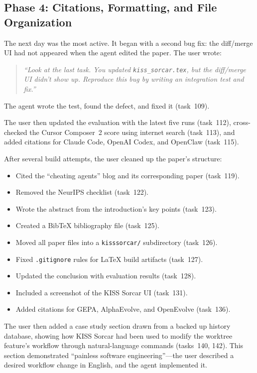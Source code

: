 \documentclass{article}
\begin{document}
\subsection{Phase 4: Citations, Formatting, and File Organization}
\label{sec:phase4}

The next day was the most active.  It began with a second bug fix: the diff/merge UI had not appeared when the agent edited the paper.  The user wrote:

\begin{quote}
\textit{``Look at the last task.  You updated \texttt{kiss\_sorcar.tex}, but the diff/merge UI didn't show up.  Reproduce this bug by writing an integration test and fix.''}
\end{quote}

The agent wrote the test, found the defect, and fixed it (task~109).

The user then updated the evaluation with the latest five runs (task~112), cross-checked the Cursor Composer~2 score using internet search (task~113), and added citations for Claude Code, OpenAI Codex, and OpenClaw (task~115).

After several build attempts, the user cleaned up the paper's structure:

\begin{itemize}[nosep]
  \item Cited the ``cheating agents'' blog and its corresponding paper (task~119).
  \item Removed the NeurIPS checklist (task~122).
  \item Wrote the abstract from the introduction's key points (task~123).
  \item Created a BibTeX bibliography file (task~125).
  \item Moved all paper files into a \texttt{kisssorcar/} subdirectory (task~126).
  \item Fixed \texttt{.gitignore} rules for \LaTeX{} build artifacts (task~127).
  \item Updated the conclusion with evaluation results (task~128).
  \item Included a screenshot of the KISS Sorcar UI (task~131).
  \item Added citations for GEPA, AlphaEvolve, and OpenEvolve (task~136).
\end{itemize}

The user then added a case study section drawn from a backed up history database, showing how KISS Sorcar had been used to modify the worktree feature's workflow through natural-language commands (tasks~140, 142).  This section demonstrated ``painless software engineering''---the user described a desired workflow change in English, and the agent implemented it.
\end{document}
